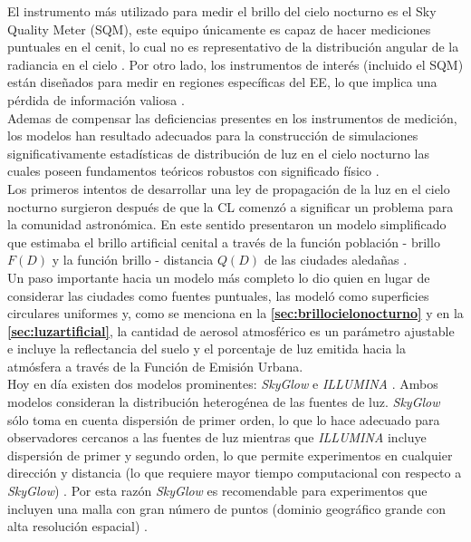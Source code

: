 El instrumento más utilizado para medir el brillo del cielo nocturno es el Sky Quality Meter (SQM), este equipo únicamente es capaz de hacer mediciones puntuales en el cenit, lo cual no es representativo de la distribución angular de la radiancia en el cielo \citep{Ribas2015}. Por otro lado, los instrumentos de interés (incluido el SQM) están diseñados para medir en regiones específicas del EE, lo que implica una pérdida de información valiosa \citep{Ribas2015}.\\

Ademas de compensar las deficiencias presentes en los instrumentos de medición, los modelos han resultado adecuados para la construcción de simulaciones significativamente estadísticas de distribución de luz en el cielo nocturno las cuales poseen fundamentos teóricos robustos con significado físico \citep{Solano2015}.\\

Los primeros intentos de desarrollar una ley de propagación de la luz en el cielo nocturno surgieron después de que la CL comenzó a significar un problema para la comunidad astronómica. En este sentido \cite{Bertiau1973} presentaron un modelo simplificado que estimaba el brillo artificial cenital a través de la función población - brillo $F (D)$ y la función brillo - distancia $Q (D)$ de las ciudades aledañas \citep{Linares2018}.\\

Un paso importante hacia un modelo más completo lo dio \cite{Garstang1986} quien en lugar de considerar las ciudades como fuentes puntuales, las modeló como superficies circulares uniformes \citep{Linares2018} y, como se menciona en la \textbf{\autoref{sec:brillocielonocturno}} y en la \textbf{\autoref{sec:luzartificial}}, la cantidad de aerosol atmosférico es un parámetro ajustable e incluye la reflectancia del suelo y el porcentaje de luz emitida hacia la atmósfera a través de la Función de Emisión Urbana.\\

Hoy en día existen dos modelos prominentes: \textit{SkyGlow} \citep{Kocifaj2007} e \textit{ILLUMINA} \citep{Aube2005}. Ambos modelos consideran la distribución heterogénea de las fuentes de luz. \textit{SkyGlow} sólo toma en cuenta dispersión de primer orden, lo que lo hace adecuado para observadores cercanos a las fuentes de luz mientras que \textit{ILLUMINA} incluye dispersión de primer y segundo orden, lo que permite experimentos en cualquier dirección y distancia (lo que requiere mayor tiempo computacional con respecto a \textit{SkyGlow}) \citep{Linares2018}. Por esta razón \textit{SkyGlow} es recomendable para experimentos que incluyen una malla con gran número de puntos (dominio geográfico grande con alta resolución espacial) \citep{Linares2018}.\\

